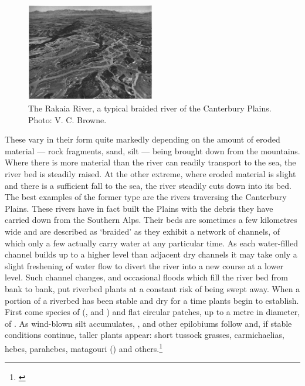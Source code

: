 \begin{figure}
	\includegraphics[width=0.5\textwidth]{graphics/figure87rakaia.jpg}
	\centering
	\caption[The Rakaia River]{The Rakaia River, a typical braided river of the Canterbury Plains.
	Photo: V. C. Browne.}%
	\label{fig:87rakaia}
\end{figure}

These vary in their form quite markedly depending on the amount of eroded material --- rock fragments, sand, silt --- being brought down from the mountains.
Where there is more material than the river can readily transport to the sea, the river bed is steadily raised.
At the other extreme, where eroded material is slight and there is a sufficient fall to the sea, the river steadily cuts down into its bed.
The best examples of the former type are the rivers traversing the Canterbury Plains.
These rivers have in fact built the Plains with the debris they have carried down from the Southern Alps.
Their beds are sometimes a few kilometres wide and are described as `braided' as they exhibit a network of channels, of which only a few actually carry water at any particular time.
As each water-filled channel builds up to a higher level than adjacent dry channels it may take only a slight freshening of water flow to divert the river into a new course at a lower level.
Such channel changes, and occasional floods which fill the river bed from bank to bank, put riverbed plants at a constant risk of being swept away.
When a portion of a riverbed has been stable and dry for a time plants begin to establish.
First come species of  (,  and ) and flat circular patches, up to a metre in diameter, of .
As wind-blown silt accumulates, ,  and other epilobiums follow and, if stable conditions continue, taller plants appear: short tussock grasses, carmichaelias, hebes, parahebes, matagouri () and others.\footnote{\cite{calder1961plant}}

